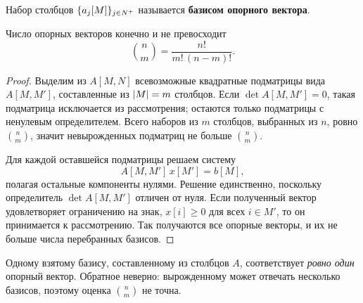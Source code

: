 \begin{definition}\label{def:basis}
Набор столбцов $\{a_j[M]\}_{j \in N^{+}}$ называется \textbf{базисом опорного вектора}.
\end{definition}

\begin{lemma}\label{lem:count}
Число опорных векторов конечно и не превосходит
\[
  \binom{n}{m} = \frac{n!}{m!\,(n-m)!} .
\]
\end{lemma}


\begin{proof}
Выделим из $A[M,N]$ всевозможные квадратные подматрицы вида $A[M,M']$,
составленные из $\left\lvert M \right\rvert = m$ столбцов. Если $\det A[M,M'] = 0$, такая подматрица
исключается из рассмотрения; остаются только подматрицы с ненулевым определителем.
Всего наборов из $m$ столбцов, выбранных из $n$, ровно $\binom{n}{m}$, значит
невырожденных подматриц не больше $\binom{n}{m}$.

Для каждой оставшейся подматрицы решаем систему
\[
  A[M,M']\, x[M'] = b[M] ,
\]
полагая остальные компоненты нулями. Решение единственно, поскольку определитель
$\det A[M,M']$ отличен от нуля. Если полученный вектор удовлетворяет ограничению на знак,
$x[i] \ge 0$ для всех $i \in M'$, то он принимается к рассмотрению. Так получаются
все опорные векторы, и их не больше числа перебранных базисов.
\end{proof}

\begin{remark}
Одному взятому базису, составленному из столбцов $A$, соответствует \emph{ровно один}
опорный вектор. Обратное неверно: вырожденному \ov{} может отвечать несколько
базисов, поэтому оценка $\binom{n}{m}$ не точна.
\end{remark}


